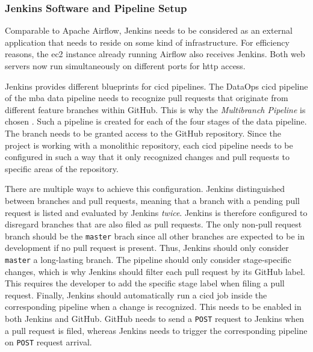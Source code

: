 \subsubsection{Jenkins Software and Pipeline Setup}
Comparable to Apache Airflow, Jenkins needs to be considered as an external application that needs to reside on some kind of infrastructure. For efficiency reasons, the \ac{ec2} instance already running Airflow also receives Jenkins. Both web servers now run simultaneously on different ports for \acs{http} access.

Jenkins provides different blueprints for \ac{cicd} pipelines. The DataOps \ac{cicd} pipeline of the \ac{mba} data pipeline needs to recognize pull requests that originate from different feature branches within GitHub. This is why the \textit{Multibranch Pipeline} is chosen \cite{jenkins}. Such a pipeline is created for each of the four stages of the data pipeline. The branch needs to be granted access to the GitHub repository. Since the project is working with a monolithic repository, each \ac{cicd} pipeline needs to be configured in such a way that it only recognized changes and pull requests to specific areas of the repository.

There are multiple ways to achieve this configuration. Jenkins distinguished between branches and pull requests, meaning that a branch with a pending pull request is listed and evaluated by Jenkins \textit{twice}. Jenkins is therefore configured to disregard branches that are also filed as pull requests. The only non-pull request branch should be the \texttt{master} brach since all other branches are expected to be in development if no pull request is present. Thus, Jenkins should only consider \texttt{master} a long-lasting branch. The pipeline should only consider stage-specific changes, which is why Jenkins should filter each pull request by its GitHub label. This requires the developer to add the specific stage label when filing a pull request. Finally, Jenkins should automatically run a \ac{cicd} job inside the corresponding pipeline when a change is recognized. This needs to be enabled in both Jenkins and GitHub. GitHub needs to send a \texttt{POST} request to Jenkins when a pull request is filed, whereas Jenkins needs to trigger the corresponding pipeline on \texttt{POST} request arrival.

